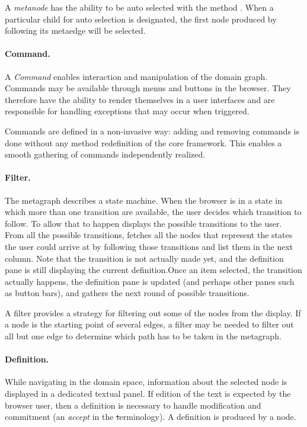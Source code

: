\documentclass[a4paper,10pt,twoside]{book}
\begin{document}
A \emph{metanode} has the ability to be auto selected with the method . When a particular child for auto selection is designated, the first node produced by following its metaedge will be selected.

\paragraph{Command.} A \emph{Command} enables interaction and manipulation of the domain graph. Commands may be available through menus and buttons in the browser. They therefore have the ability to render themselves in a user interfaces and are responsible for handling exceptions that may occur when triggered. 

Commands are defined in a non-invasive way: adding and removing commands is done without any method redefinition of the core framework. This enables a smooth gathering of commands independently realized.

\paragraph{Filter.} 
The metagraph describes a state machine. When the browser is in a state in which more than one transition are available, the user decides which transition to follow. To allow that to happen \ob displays the possible transitions  to the user. From all the possible transitions, \obf fetches all the nodes that represent the states the user could arrive at by following those transitions and list them in the next column. Note that the transition is not actually made yet, and the definition pane is still displaying the current definition.Once an item selected, the transition  actually happens, the definition pane is updated (and perhaps other panes such as button bars), and \ob gathers the next round of possible transitions.


A filter provides a strategy for filtering out some of the nodes from the display. If a node is the starting point of several edges, a filter may be needed to filter out all but one edge to determine which path has to be taken in the metagraph. 

\paragraph{Definition.} While navigating in the domain space, information about the selected node is displayed in a dedicated textual panel. If edition of the text is expected by the browser user, then a definition is necessary to handle modification and commitment (\ie an \emph{accept} in the \st terminology). A definition is produced by a node. 
\end{document}
